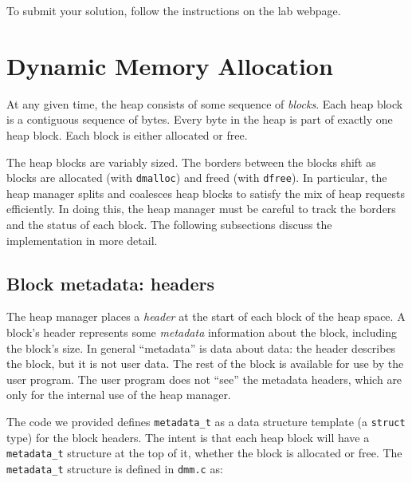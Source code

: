 \documentclass[a4paper,10pt]{article}
\newcommand{\comment}[1]{}
\begin{document}
\comment{We strongly encourage you to start early and invest time in understanding the concepts. The number of lines
of code you write for this lab need not be more than few dozens; however, you might be drawing
lots of diagrams to understand the concepts behind pointers and managing
linked lists, and analyzing the tradeoffs between the implementation choices.}

To submit your solution, follow the instructions on the lab webpage.

\section{Dynamic Memory Allocation}

At any given time, the heap consists of some sequence of {\it blocks}.   Each
heap block is a contiguous sequence of bytes.  Every byte in the
heap is part of exactly one heap block.  Each block is either
allocated or free.

The heap blocks are variably sized.  The borders between the blocks shift as blocks
are allocated (with \texttt{dmalloc}) and freed (with
\texttt{dfree}).  In particular, the heap manager splits and coalesces
heap blocks to satisfy the mix of heap requests efficiently.   In
doing this, the heap manager must be careful to track the borders and
the status of each block.  The following subsections discuss the implementation in more detail.

\subsection{Block metadata: headers}

The heap manager places a {\it header} at the start of each block of
the heap space.  A block's header represents some {\it metadata}
information about the block, including the block's size.    In general
``metadata'' is data about data: the header describes the block, but
it is not user data.  The rest of the block is available for use by the user program.
The user program
does not ``see'' the metadata headers, which are only for the internal use of the heap manager.

The code we provided defines \texttt{metadata\_t} as a data structure template (a \texttt{struct}
type) for the block headers.  The
intent is that each heap block will have a \texttt{metadata\_t}
structure at the top of it, whether the block is allocated or free.
The \texttt{metadata\_t} structure is defined in
\texttt{dmm.c} as:
\end{document}
